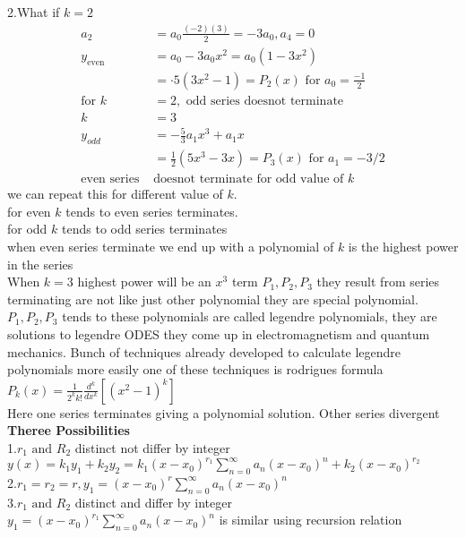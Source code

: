 2.\quad What if $k=2$
\begin{align*}
a_2&=a_{0} \frac{(-2)(3)}{2}=-3 a_{0}, a_{4}=0\\
y_{\text {even }}&=a_{0}-3 a_{0} x^{2}=a_{0}\left(1-3 x^{2}\right)\\
&=\cdot 5\left(3 x^{2}-1\right)=P_{2}(x) \text{ for }a_0=\frac{-1}{2}\\
\text{for }k&=2,\text{ odd series doesnot terminate}\\
k&=3\\
y_ {odd} &=-\frac{5}{3} a_1 x^{3}+a_{1} x\\
&=\frac{1}{2}\left(5 x^{3}-3 x\right)=P_{3}(x)\text{ for }a_{1}=-3 / 2\\
\text{even series }&\text{doesnot terminate for odd value of $k$}
\end{align*}
we can repeat this for different value of $k$. \\for even $k$ tends to even series terminates.\\
for odd $k$ tends to odd series terminates\\
when even series terminate we end up with a polynomial of $k$ is the highest power in the series \\
When $k=3$  highest power will be an $x^3$ term $P_1, P_2, P_3$ they result from series terminating are not like just other polynomial they are special polynomial.\\
$P_1, P_2, P_3$ tends to these polynomials are called legendre polynomials, they are solutions to legendre ODES they come up in electromagnetism and quantum mechanics. Bunch of techniques already developed to calculate legendre polynomials more easily one of these techniques is rodrigues formula
$P_{k}(x)=\frac{1}{2^{k} k !} \frac{d^{k}}{d x^{k}}\left[\left(x^{2}-1\right)^{k}\right]$\\
Here one series terminates giving a polynomial solution. Other series divergent\\
\textbf{Theree Possibilities}\\
1.\quad $r_1\text{ and }R_2$ distinct not differ by integer\\
$y(x)=k_1y_1+k_2y_2=k_1(x-x_0)^{r_1}\sum\limits_{n=0}^{\infty}a_n(x-x_0)^n+k_2(x-x_0)^{r_2}$\\
2.\quad $r_1=r_2=r,y_1=(x-x_0)^r\sum_{n=0}^{\infty} a_{n}\left(x-x_{0}\right)^{n}$\\
3.\quad $r_1\text{ and }R_2$ distinct and differ by integer\\
$y_1=(x-x_0)^{r_1}\sum_{n=0}^{\infty} a_{n}\left(x-x_{0}\right)^{n}$ is similar using recursion relation \\
